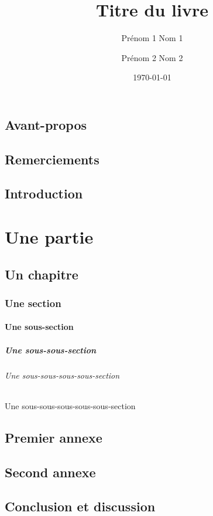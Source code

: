 \documentclass[a4paper]{book}
\title{Titre du livre}
\author{Prénom 1 Nom 1 \and Prénom 2 Nom 2}
\date{\today}
\begin{document}
 
\maketitle
 
    \frontmatter
 
    \chapter{Avant-propos}
    \chapter{Remerciements}
    \chapter{Introduction}
 
    \mainmatter
 
    \part{Une partie}
    \chapter{Un chapitre}
    \section{Une section}
    \subsection{Une sous-section}
    \subsubsection{Une sous-sous-section}
    \paragraph{Une sous-sous-sous-sous-section}
    \subparagraph{Une sous-sous-sous-sous-sous-section}
 
    \appendix
 
    \chapter{Premier annexe}
    \chapter{Second annexe}
 
    \backmatter
 
    \chapter{Conclusion et discussion}
 
    \tableofcontents    %
    \listoffigures        %
    \listoftables        %
 
\end{document}
